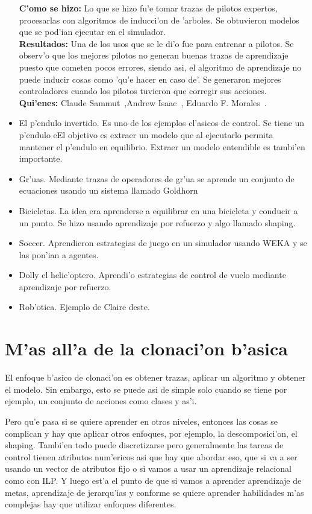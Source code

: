 \documentclass[11pt]{article}
\begin{document}
\begin{itemize}
\textbf{C'omo se hizo:} Lo que se hizo fu'e tomar trazas de pilotos expertos, procesarlas con algoritmos de inducci'on de 'arboles. Se obtuvieron modelos que se pod'ian ejecutar en el simulador. \\
\textbf{Resultados:} Una de los usos que se le di'o fue para entrenar a pilotos. Se observ'o que los mejores pilotos no generan buenas trazas de aprendizaje puesto que cometen pocos errores, siendo asi, el algoritmo de aprendizaje no puede inducir cosas como 'qu'e hacer en caso de'. Se generaron mejores controladores cuando los pilotos tuvieron que corregir sus acciones.\\
\textbf{Qui'enes:} Claude Sammut~\cite{Sammut92learningto},Andrew Isaac~\cite{Isaac03goal-directedlearning}, Eduardo F. Morales~\cite{Morales04learningto}.
\item El p'endulo invertido. Es uno de los ejemplos cl'asicos de control. Se tiene un p'endulo eEl objetivo es extraer un modelo que al ejecutarlo permita mantener el p'endulo en equilibrio. Extraer un modelo entendible es tambi'en importante.~\cite{Suc99skillmodelling}~\cite{And99modellingof}
\item Gr'uas. Mediante trazas de operadores de gr'ua se aprende un conjunto de ecuaciones usando un sistema llamado Goldhorn
\item Bicicletas. La idea era aprenderse a equilibrar en una bicicleta y conducir a un punto. Se hizo usando aprendizaje por refuerzo y algo llamado shaping.
\item Soccer. Aprendieron estrategias de juego en un simulador usando WEKA y se las pon'ian a agentes.
\item Dolly el helic'optero. Aprendi'o estrategias de control de vuelo mediante aprendizaje por refuerzo.
\item Rob'otica. Ejemplo de Claire deste.
\end{itemize}


\section{M'as all'a de la clonaci'on b'asica}
El enfoque b'asico de clonaci'on es obtener trazas, aplicar un algoritmo y obtener el modelo. Sin embargo, esto se puede asi de simple solo cuando se tiene por ejemplo, un conjunto de acciones como clases y as'i. 

Pero qu'e pasa si se quiere aprender en otros niveles, entonces las cosas se complican y hay que aplicar otros enfoques, por ejemplo, la descomposici'on, el shaping. Tambi'en todo puede discretizarse pero generalmente las tareas de control tienen atributos num'ericos asi que hay que abordar eso, que si va a ser usando un vector de atributos fijo o si vamos a usar un aprendizaje relacional como con ILP. Y luego est'a el punto de que si vamos a aprender aprendizaje de metas, aprendizaje de jerarqu'ias y conforme se quiere aprender habilidades m'as complejas hay que utilizar enfoques diferentes.
\end{document}
